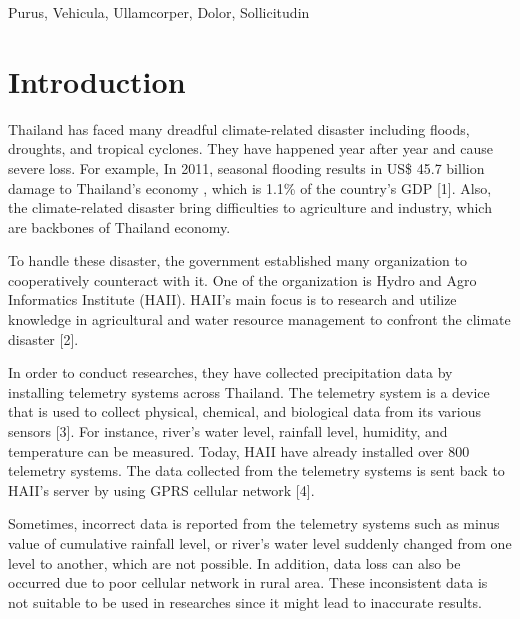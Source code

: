 \documentclass[conference]{IEEEtran}
\begin{document}
\begin{IEEEkeywords}
Purus, Vehicula, Ullamcorper, Dolor, Sollicitudin
\end{IEEEkeywords}

\IEEEpeerreviewmaketitle

\section{Introduction}

Thailand has faced many dreadful climate-related disaster including floods, droughts, and tropical cyclones. They have happened year after year and cause severe loss. For example, In 2011, seasonal flooding results in US\$ 45.7 billion damage to Thailand’s economy , which is 1.1\% of the country’s GDP [1]. Also, the climate-related disaster bring difficulties to agriculture and industry, which are backbones of Thailand economy.

To handle these disaster, the government established many organization to cooperatively counteract with it. One of the organization is Hydro and Agro Informatics Institute (HAII). HAII’s main focus is to research and utilize knowledge in agricultural and water resource management to confront the climate disaster [2].

In order to conduct researches, they have collected precipitation data by installing telemetry systems across Thailand. The telemetry system is a device that is used to collect physical, chemical, and biological data from its various sensors [3]. For instance, river’s water level, rainfall level, humidity, and temperature can be measured. Today, HAII have already installed over 800 telemetry systems. The data collected from the telemetry systems is sent back to HAII’s server by using GPRS cellular network [4].

Sometimes, incorrect data is reported from the telemetry systems such as minus value of cumulative rainfall level, or river’s water level suddenly changed from one level to another, which are not possible. In addition, data loss can also be occurred due to poor cellular network in rural area. These inconsistent data is not suitable to be used in researches since it might lead to inaccurate results.
\end{document}
